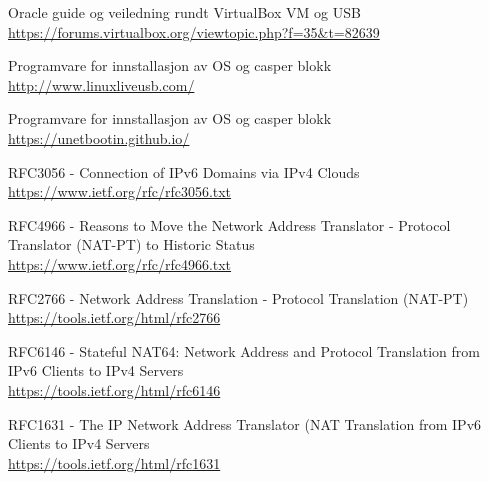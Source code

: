 \documentclass{article}
\begin{document}
\begin{thebibliography}{50}
Oracle guide og veiledning rundt VirtualBox VM og USB
\\\url{https://forums.virtualbox.org/viewtopic.php?f=35&t=82639}

Programvare for innstallasjon av OS og casper blokk
\\\url{http://www.linuxliveusb.com/}

Programvare for innstallasjon av OS og casper blokk
\\\url{https://unetbootin.github.io/}

RFC3056 - Connection of IPv6 Domains via IPv4 Clouds
\\\url{https://www.ietf.org/rfc/rfc3056.txt}

RFC4966 - Reasons to Move the Network Address Translator - Protocol Translator (NAT-PT) to Historic Status
\\\url{https://www.ietf.org/rfc/rfc4966.txt}

RFC2766 - Network Address Translation - Protocol Translation (NAT-PT)
\\\url{https://tools.ietf.org/html/rfc2766}

RFC6146 - Stateful NAT64: Network Address and Protocol Translation from IPv6 Clients to IPv4 Servers
\\\url{https://tools.ietf.org/html/rfc6146}

RFC1631 - The IP Network Address Translator (NAT Translation from IPv6 Clients to IPv4 Servers
\\\url{https://tools.ietf.org/html/rfc1631}

\end{thebibliography}
\end{document}
